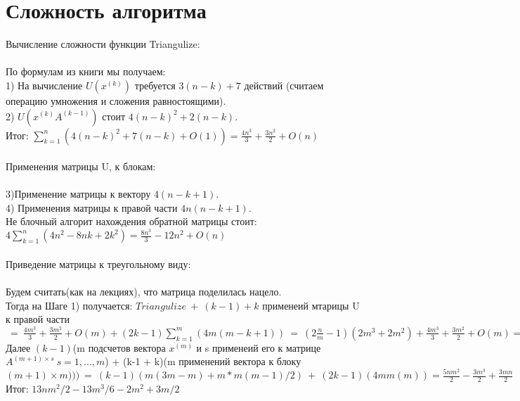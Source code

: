 \documentclass[a4paper,12pt]{article}
\begin{document}
\section{Сложность алгоритма}
{\fontsize{14}{14}\selectfont Вычисление сложности функции Triangulize:}\\\\
По формулам из книги мы получаем:\\ 
1) На вычисление $U(x^{(k)})$ требуется $3(n-k)+7$ действий (считаем операцию умножения и сложения равностоящими).\\
2) $U(x^{(k)}A^{(k-1)})$ стоит $4(n-k)^{2} + 2(n-k)$.\\
Итог: $\sum\limits_{k = 1}^n(4(n-k)^2 + 7(n-k) + O(1)) = \frac{4n^{3}}{3} + \frac{3n^2}{2} + O(n)$
\\\\
{\fontsize{14}{14}\selectfont Применения матрицы U, к блокам:}\\\\
3)Применение матрицы к вектору $4(n-k+1)$.\\
4) Применения матрицы к правой части $4n(n-k+1)$.\\
Не блочный алгорит нахождения обратной матрицы стоит:\\
$4\sum\limits_{k = 1}^n (4n{^2} - 8nk + 2k^2) = \frac{8n^{3}}{3} - 12n^{2} + O(n)$\\\\
{\fontsize{14}{14}\selectfont Приведение матрицы к треугольному виду:}\\\\
Будем считать(как на лекциях), что матрица поделилась нацело.\\
Тогда на Шаге 1) получается: $Triangulize \ + \ (k-1) + k$ применеий мтарицы U к правой части $\ = \ \frac{4m^{3}}{3} + \frac{3m^2}{2} + O(m)  + (2k-1)\sum\limits_{k = 1}^m (4m(m-k+1)) \ = \ (2\frac{n}{m}-1)(2m^{3}+ 2m^{2}) + \frac{4m^{3}}{3} + \frac{3m^2}{2} + O(m)  = \frac{4m^{3}}{3} + \frac{3m^2}{2} + O(m) + 4nm^{2}-2m^{3} - 2m^{2}+ 4mn = 4nm^{2} - \frac{2m^{3}}{3} -\frac{m^{2}}{2} + O(mn)$\\
Далее $(k-1)$(m подсчетов вектора $x^{(m)}$ и s применеий его к матрице $A^{(m+1)\times s} \ s = 1,...,m$) + (k-1 + k)(m применений вектора к блоку $(m+1)\times m)))\ = \ (k-1)(m(3m-m) + m*m(m-1)/2)\ + \ (2k-1)(4mm(m)) = \frac{5nm^{2}}{2} - \frac{3m^{3}}{2} + \frac{3mn}{2}$\\
Итог: $13nm^{2}/2 -13m^{3}/6 - 2m^{2}+3m/2$\\\\
\end{document}
